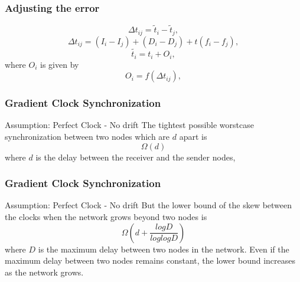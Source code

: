 \documentclass[t]{beamer}
\begin{document}
\begin{frame}
    \frametitle{Adjusting the error}
\begin{equation}
\Delta t_{ij} = \tilde t_i  - \tilde t_j  ,
\end{equation}
\newline
\begin{equation}
 \Delta t_{ij} = (I_i - I_j) + (D_i-D_j) + t(f_i - f_j) ,
\end{equation}
\newline
\begin{equation}
\tilde{t_i} = t_i + O_i ,
\end{equation}
\newline
where $O_i$ is given by \newline
\begin{equation}
O_i = f(\Delta t_{ij}) ,
\end{equation}
\end{frame}
\begin{frame}
\end{frame}
\begin{frame}
 \frametitle{Gradient Clock Synchronization}
  Assumption: Perfect Clock - No drift \newline \newline
  The tightest possible worstcase synchronization between two nodes which are $d$ apart is
  \begin{equation}
   \Omega(d)
  \end{equation}
  where \newline
  $d$ is the delay between the receiver and the sender nodes,\newline
  \newline
\end{frame}
\begin{frame}
 \frametitle{Gradient Clock Synchronization}
  Assumption: Perfect Clock - No drift \newline \newline
  But the lower bound of the skew between the clocks when the network grows beyond two nodes is
  \begin{equation}
   \Omega(d + \frac{logD}{loglogD})
  \end{equation}
\newline
  where \newline \newline
  $D$ is the maximum delay between two nodes in the network. \newline
  \newline
  Even if the maximum delay between two nodes remains constant, the lower bound increases as the network grows.
\end{frame}
\end{document}
